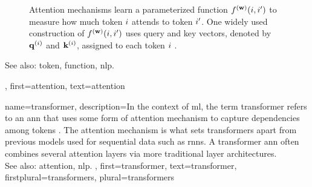 {{\begin{figure}[H]
		\caption{Attention mechanisms learn a parameterized \gls{function} $f^{({\bf w})}(i,i')$ to measure 
			how much \gls{token} $i$ attends to \gls{token} $i'$. 
			One widely used construction of $f^{({\bf w})}(i,i')$ 
			uses query and key \glspl{vector}, denoted by ${\bf q}^{(i)}$ and ${\bf k}^{(i)}$, assigned to each 
			\gls{token} $i$ \cite{vaswani2017attention}. \label{fig_attention_dict}}
		\end{figure}
		See also: \gls{token}, \gls{function}, \gls{nlp}.},
	first={attention},
	text={attention}
}

{name={transformer},
	description={In the context of \gls{ml}, the term transformer 
 		refers to an \gls{ann} that uses some form of \gls{attention} mechanism 
 		to capture dependencies among \glspl{token} \cite{vaswani2017attention}. 
 		The \gls{attention} mechanism is what sets transformers apart from 
		previous \glspl{model} used for sequential \gls{data} such as \glspl{rnn}. 
		A transformer \gls{ann} often combines several \gls{attention} \glspl{layer} 
		via more traditional \gls{layer} architectures. 
		\\ 
		See also: \gls{attention}, \gls{nlp}. }, 
 	first={transformer}, 
 	text={transformer},
 	firstplural={transformers}, 
 	plural={transformers}
}


